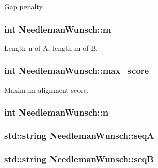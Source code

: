 Gap penalty. 

\hypertarget{class_needleman_wunsch_a57c16e0704f58fa1cb4c5caf77dd3224}{
\subsubsection[{m}]{\setlength{\rightskip}{0pt plus 5cm}int Needleman\+Wunsch\+::m\hspace{0.3cm}{\ttfamily [private]}}}\label{class_needleman_wunsch_a57c16e0704f58fa1cb4c5caf77dd3224}


Length n of A, length m of B. 

\hypertarget{class_needleman_wunsch_a4424562e115a1ecb43648aaf4d40e90d}{
\subsubsection[{max\+\_\+score}]{\setlength{\rightskip}{0pt plus 5cm}int Needleman\+Wunsch\+::max\+\_\+score\hspace{0.3cm}{\ttfamily [private]}}}\label{class_needleman_wunsch_a4424562e115a1ecb43648aaf4d40e90d}


Maximum alignment score. 

\hypertarget{class_needleman_wunsch_aad1e6ea335606069514970380d29b66c}{
\subsubsection[{n}]{\setlength{\rightskip}{0pt plus 5cm}int Needleman\+Wunsch\+::n\hspace{0.3cm}{\ttfamily [private]}}}\label{class_needleman_wunsch_aad1e6ea335606069514970380d29b66c}
\hypertarget{class_needleman_wunsch_aeda77308a2f7866e36c4d1f518d53dcf}{
\subsubsection[{seq\+A}]{\setlength{\rightskip}{0pt plus 5cm}std\+::string Needleman\+Wunsch\+::seq\+A\hspace{0.3cm}{\ttfamily [private]}}}\label{class_needleman_wunsch_aeda77308a2f7866e36c4d1f518d53dcf}
\hypertarget{class_needleman_wunsch_a2da968f8712b2a7c69214be8bc09097b}{
\subsubsection[{seq\+B}]{\setlength{\rightskip}{0pt plus 5cm}std\+::string Needleman\+Wunsch\+::seq\+B\hspace{0.3cm}{\ttfamily [private]}}}\label{class_needleman_wunsch_a2da968f8712b2a7c69214be8bc09097b}


